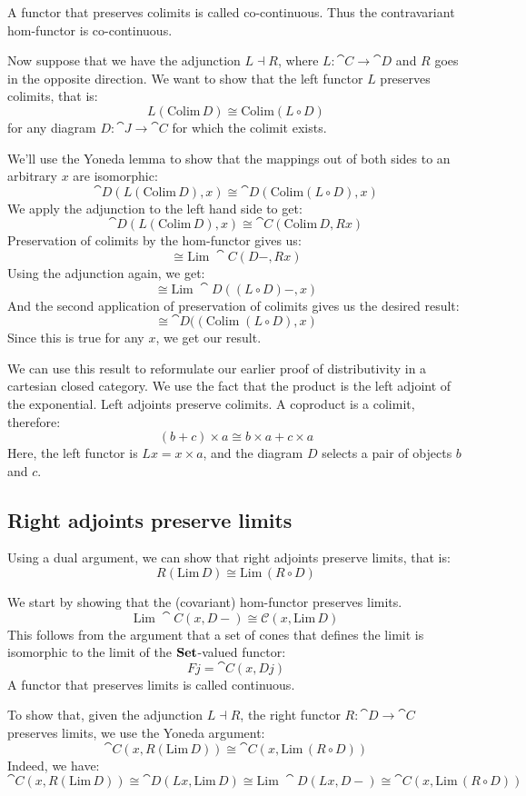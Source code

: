 \documentclass[DaoFP]{subfiles}
\begin{document}
A functor that preserves colimits is called co-continuous. Thus the contravariant hom-functor is co-continuous.

Now suppose that we have the adjunction $L \dashv R$, where $L \colon \cat C \to \cat D$ and $R$ goes in the opposite direction. We want to show that the left functor $L$ preserves colimits, that is:
\[ L (\text{Colim} \, D) \cong \text{Colim} (L \circ D) \]
for any diagram $D \colon \cat J \to \cat C$ for which the colimit exists.

We'll use the Yoneda lemma to show that the mappings out of both sides to an arbitrary $x$ are isomorphic:
\[ \cat D( L (\text{Colim} \, D), x) \cong \cat D (\text{Colim} (L \circ D), x) \]
We apply the adjunction to the left hand side to get:
\[ \cat D( L (\text{Colim} \, D), x) \cong \cat C (\text{Colim}\, D, R x) \]
Preservation of colimits by the hom-functor gives us:
\[ \cong \text{Lim}\; \cat C(D -, R x) \]
Using the adjunction again, we get:
\[ \cong \text{Lim}\; \cat D((L \circ D) -, x) \]
And the second application of preservation of colimits gives us the desired result:
\[ \cong  \cat D((\text{Colim}\;(L \circ D), x) \]
Since this is true for any $x$, we get our result.

We can use this result to reformulate our earlier proof of distributivity in a cartesian closed category. We use the fact that the product is the left adjoint of the exponential. Left adjoints preserve colimits. A coproduct is a colimit, therefore:
\[(b + c) \times a \cong b \times a + c \times a \]
Here, the left functor is $L x = x \times a$, and the diagram $D$ selects a pair of objects $b$ and $c$. 

\subsection{Right adjoints preserve limits}
Using a dual argument, we can show that right adjoints preserve limits, that is:
\[ R (\text{Lim}\, D) \cong \text{Lim}\, (R \circ D) \]

We start by showing that the (covariant) hom-functor preserves limits. 
\[ \text{Lim}\; \cat C( x, D-) \cong \mathcal{C}(x, \text{Lim}\,D) \]
This follows from the argument that a set of cones that defines the limit is isomorphic to the limit of the $\mathbf{Set}$-valued functor:
\[ F j = \cat C(x, D j) \]
A functor that preserves limits is called continuous.

To show that, given the adjunction $L \dashv R$, the right functor $R \colon \cat D \to \cat C$ preserves limits, we use the Yoneda argument:
\[ \cat C(x, R (\text{Lim}\, D)) \cong \cat C (x, \text{Lim}\, (R \circ D)) \]
Indeed, we have:
\[ \cat C(x, R (\text{Lim}\, D)) \cong \cat D(L x, \text{Lim}\, D) \cong \text{Lim}\; \cat D(L x, D-) \cong \cat C(x, \text{Lim}\, (R \circ D))\]
\end{document}
